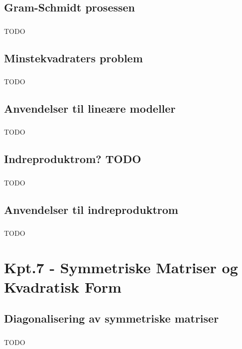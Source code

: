 \documentclass{article}
\begin{document}
    \subsection{Gram-Schmidt prosessen}
      \subsubsection{}
        TODO
    \subsection{Minstekvadraters problem}
      \subsubsection{}
        TODO
    \subsection{Anvendelser til lineære modeller}
      \subsubsection{}
        TODO
    \subsection{Indreproduktrom? TODO}
      \subsubsection{}
        TODO
    \subsection{Anvendelser til indreproduktrom}
      \subsubsection{}
        TODO
  \section{Kpt.7 - Symmetriske Matriser og Kvadratisk Form}
    \subsection{Diagonalisering av symmetriske matriser}
      \subsubsection{}
        TODO
\end{document}
